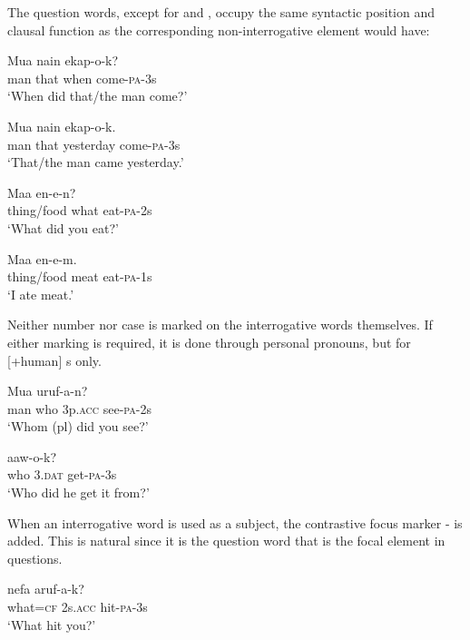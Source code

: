 The question words, except for  and , occupy the same syntactic position and clausal function as the corresponding non-interrogative element would have:

\ea%
\label{ex:3:x520}
\gll Mua nain  ekap-o-k? \\
man that when come-\textsc{pa}-3s\\
\glt`When did that/the man come?'
\z

\ea%
\label{ex:3:x647}
\gll Mua nain  ekap-o-k. \\
man that yesterday come-\textsc{pa}-3s\\
\glt`That/the man came yesterday.'
\z

\ea%
\label{ex:3:x521}
\gll Maa  en-e-n? \\
thing/food what eat-\textsc{pa}-2s\\
\glt`What did you eat?'
\z

\ea%
\label{ex:3:x648}
\gll Maa  en-e-m. \\
thing/food meat eat-\textsc{pa}-1s\\
\glt`I ate meat.'
\z

Neither number nor case is marked on the interrogative words themselves. If either marking is required, it is done through personal pronouns, but for [+human] s only.

\ea%
\label{ex:3:x522}
\gll Mua   uruf-a-n? \\
man who 3p.\textsc{acc} see-\textsc{pa}-2s\\
\glt`Whom (pl) did you see?'
\z

\ea%
\label{ex:3:x523}
\gll {}  aaw-o-k? \\
who 3.\textsc{dat} get-\textsc{pa}-3s\\
\glt`Who did he get it from?'
\z

When an interrogative word is used as a subject, the contrastive focus marker \nobreakdash- is added. This is natural since it is the question word that is the focal element in questions. 

\ea%
\label{ex:3:x524}
\gll {} nefa aruf-a-k? \\
what=\textsc{cf} 2s.\textsc{acc} hit-\textsc{pa}-3s\\
\glt`What hit you?'
\z

